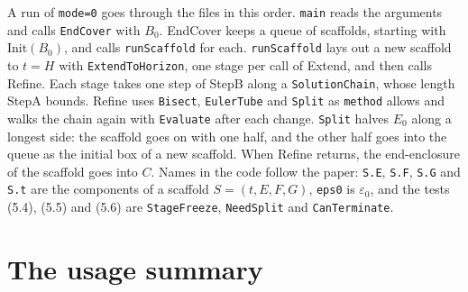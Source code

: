 \documentclass[11pt,a4paper]{article}
\newcommand{\out}[2][]{\VerbatimInput[fontsize=\footnotesize,#1]{#2}}
\newcommand{\eps}{\varepsilon}
\begin{document}
A run of \texttt{mode=0} goes through the files in this order.
\texttt{main} reads the arguments and calls \texttt{EndCover} with $B_0$.
EndCover keeps a queue of scaffolds, starting with $\mathrm{Init}(B_0)$, and
calls \texttt{runScaffold} for each. \texttt{runScaffold} lays out a new
scaffold to $t = H$ with \texttt{ExtendToHorizon}, one stage per call of
Extend, and then calls Refine. Each stage takes one step of StepB along a
\texttt{SolutionChain}, whose length StepA bounds. Refine uses
\texttt{Bisect}, \texttt{EulerTube} and \texttt{Split} as \texttt{method}
allows and walks the chain again with \texttt{Evaluate} after each change.
\texttt{Split} halves $E_0$ along a longest side: the scaffold goes on with
one half, and the other half goes into the queue as the initial box of a new
scaffold. When Refine returns, the end-enclosure of the scaffold goes into
$C$.
Names in the code follow the paper: \texttt{S.E}, \texttt{S.F},
\texttt{S.G} and \texttt{S.t} are the components of a scaffold
$S = (t, E, F, G)$, \texttt{eps0} is $\eps_0$, and the tests (5.4), (5.5) and
(5.6) are \texttt{StageFreeze}, \texttt{NeedSplit} and
\texttt{CanTerminate}.

\appendix
\section{The usage summary}\label{app:usage}

\out{out/usage.txt}
\end{document}
